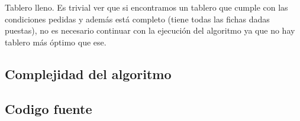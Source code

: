 Tablero lleno. Es trivial ver que si encontramos un tablero que cumple con las condiciones pedidas y adem\'as est\'a completo (tiene todas las fichas dadas puestas), no es necesario continuar con la ejecuci\'on del algoritmo ya que no hay tablero m\'as \'optimo que ese.\\

\subsection{Complejidad del algoritmo}

\newpage

\subsection{Codigo fuente}

